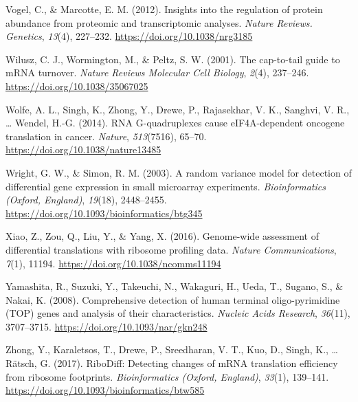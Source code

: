 \documentclass[12pt,openany]{book}
\begin{document}
\hypertarget{ref-Vogel2012}{}
Vogel, C., \& Marcotte, E. M. (2012). Insights into the regulation of
protein abundance from proteomic and transcriptomic analyses.
\emph{Nature Reviews. Genetics}, \emph{13}(4), 227--232.
\url{https://doi.org/10.1038/nrg3185}

\hypertarget{ref-Wilusz2001}{}
Wilusz, C. J., Wormington, M., \& Peltz, S. W. (2001). The cap-to-tail
guide to mRNA turnover. \emph{Nature Reviews Molecular Cell Biology},
\emph{2}(4), 237--246. \url{https://doi.org/10.1038/35067025}

\hypertarget{ref-Wolfe2014}{}
Wolfe, A. L., Singh, K., Zhong, Y., Drewe, P., Rajasekhar, V. K.,
Sanghvi, V. R., \ldots{} Wendel, H.-G. (2014). RNA G-quadruplexes cause
eIF4A-dependent oncogene translation in cancer. \emph{Nature},
\emph{513}(7516), 65--70. \url{https://doi.org/10.1038/nature13485}

\hypertarget{ref-Wright2003}{}
Wright, G. W., \& Simon, R. M. (2003). A random variance model for
detection of differential gene expression in small microarray
experiments. \emph{Bioinformatics (Oxford, England)}, \emph{19}(18),
2448--2455. \url{https://doi.org/10.1093/bioinformatics/btg345}

\hypertarget{ref-Xiao2016}{}
Xiao, Z., Zou, Q., Liu, Y., \& Yang, X. (2016). Genome-wide assessment
of differential translations with ribosome profiling data. \emph{Nature
Communications}, \emph{7}(1), 11194.
\url{https://doi.org/10.1038/ncomms11194}

\hypertarget{ref-Yamashita2008}{}
Yamashita, R., Suzuki, Y., Takeuchi, N., Wakaguri, H., Ueda, T., Sugano,
S., \& Nakai, K. (2008). Comprehensive detection of human terminal
oligo-pyrimidine (TOP) genes and analysis of their characteristics.
\emph{Nucleic Acids Research}, \emph{36}(11), 3707--3715.
\url{https://doi.org/10.1093/nar/gkn248}

\hypertarget{ref-Zhong2017}{}
Zhong, Y., Karaletsos, T., Drewe, P., Sreedharan, V. T., Kuo, D., Singh,
K., \ldots{} Rätsch, G. (2017). RiboDiff: Detecting changes of mRNA
translation efficiency from ribosome footprints. \emph{Bioinformatics
(Oxford, England)}, \emph{33}(1), 139--141.
\url{https://doi.org/10.1093/bioinformatics/btw585}
\end{document}
